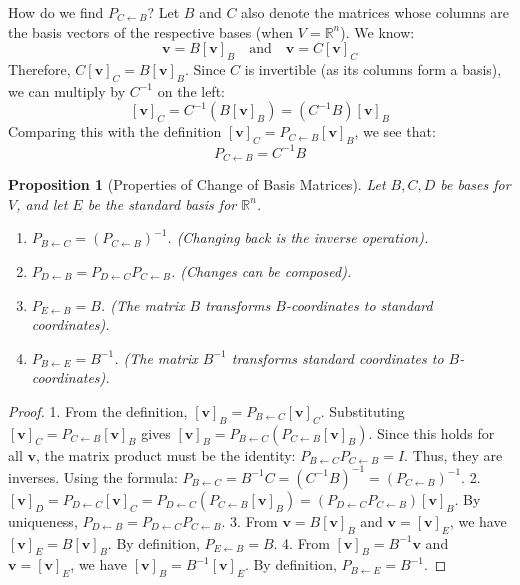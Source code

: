 \documentclass[11pt]{article}
\newtheorem{proposition}[theorem]{Proposition}
\theoremstyle{definition}
\theoremstyle{remark}
\begin{document}
How do we find $P_{C \leftarrow B}$? Let $B$ and $C$ also denote the matrices whose columns are the basis vectors of the respective bases (when $V = \mathbb{R}^n$). We know:
\[ \mathbf{v} = B [\mathbf{v}]_B \quad \text{and} \quad \mathbf{v} = C [\mathbf{v}]_C \]
Therefore, $C [\mathbf{v}]_C = B [\mathbf{v}]_B$. Since $C$ is invertible (as its columns form a basis), we can multiply by $C^{-1}$ on the left:
\[ [\mathbf{v}]_C = C^{-1} (B [\mathbf{v}]_B) = (C^{-1} B) [\mathbf{v}]_B \]
Comparing this with the definition $[\mathbf{v}]_C = P_{C \leftarrow B} [\mathbf{v}]_B$, we see that:
\[ P_{C \leftarrow B} = C^{-1} B \]

\begin{proposition}[Properties of Change of Basis Matrices]
Let $B, C, D$ be bases for $V$, and let $E$ be the standard basis for $\mathbb{R}^n$.
\begin{enumerate}
    \item $P_{B \leftarrow C} = (P_{C \leftarrow B})^{-1}$. (Changing back is the inverse operation).
    \item $P_{D \leftarrow B} = P_{D \leftarrow C} P_{C \leftarrow B}$. (Changes can be composed).
    \item $P_{E \leftarrow B} = B$. (The matrix $B$ transforms $B$-coordinates to standard coordinates).
    \item $P_{B \leftarrow E} = B^{-1}$. (The matrix $B^{-1}$ transforms standard coordinates to $B$-coordinates).
\end{enumerate}
\end{proposition}
\begin{proof}
1. From the definition, $[\mathbf{v}]_B = P_{B \leftarrow C} [\mathbf{v}]_C$. Substituting $[\mathbf{v}]_C = P_{C \leftarrow B} [\mathbf{v}]_B$ gives $[\mathbf{v}]_B = P_{B \leftarrow C} (P_{C \leftarrow B} [\mathbf{v}]_B)$. Since this holds for all $\mathbf{v}$, the matrix product must be the identity: $P_{B \leftarrow C} P_{C \leftarrow B} = I$. Thus, they are inverses. Using the formula: $P_{B \leftarrow C} = B^{-1} C = (C^{-1} B)^{-1} = (P_{C \leftarrow B})^{-1}$.
2. $[\mathbf{v}]_D = P_{D \leftarrow C} [\mathbf{v}]_C = P_{D \leftarrow C} (P_{C \leftarrow B} [\mathbf{v}]_B) = (P_{D \leftarrow C} P_{C \leftarrow B}) [\mathbf{v}]_B$. By uniqueness, $P_{D \leftarrow B} = P_{D \leftarrow C} P_{C \leftarrow B}$.
3. From $\mathbf{v} = B [\mathbf{v}]_B$ and $\mathbf{v} = [\mathbf{v}]_E$, we have $[\mathbf{v}]_E = B [\mathbf{v}]_B$. By definition, $P_{E \leftarrow B} = B$.
4. From $[\mathbf{v}]_B = B^{-1} \mathbf{v}$ and $\mathbf{v} = [\mathbf{v}]_E$, we have $[\mathbf{v}]_B = B^{-1} [\mathbf{v}]_E$. By definition, $P_{B \leftarrow E} = B^{-1}$.
\end{proof}
\end{document}
